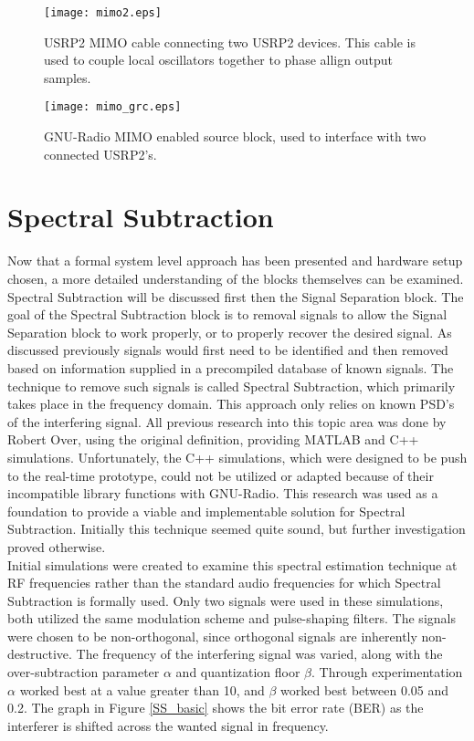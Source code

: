 \begin{figure}[!ht]
\centering
\texttt{[image: mimo2.eps]}%
\caption{USRP2 MIMO cable connecting two USRP2 devices.  This cable is used to couple local oscillators together to phase allign output samples.}
\label{mimo}
\end{figure} 

\begin{figure}[!ht]
\centering
\texttt{[image: mimo\_grc.eps]}
\caption{GNU-Radio MIMO enabled source block, used to interface with two connected USRP2's.}
\label{mimo_grc}
\end{figure} 


\section{Spectral Subtraction}

Now that a formal system level approach has been presented and hardware setup chosen, a more detailed understanding of the blocks themselves can be examined.  Spectral Subtraction will be discussed first then the Signal Separation block.  The goal of the Spectral Subtraction block is to removal signals to allow the Signal Separation block to work properly, or to properly recover the desired signal.  As discussed previously signals would first need to be identified and then removed based on information supplied in a precompiled database of known signals.  The technique to remove such signals is called Spectral Subtraction, which primarily takes place in the frequency domain.  This approach only relies on known PSD's of the interfering signal.  All previous research into this topic area was done by Robert Over, using the original definition, providing MATLAB and C++ simulations.  Unfortunately, the C++ simulations, which were designed to be push to the real-time prototype, could not be utilized or adapted because of their incompatible library functions with GNU-Radio.  This research was used as a foundation to provide a viable and implementable solution for Spectral Subtraction.  Initially this technique seemed quite sound, but further investigation proved otherwise.\\

Initial simulations were created to examine this spectral estimation technique at RF frequencies rather than the standard audio frequencies for which Spectral Subtraction is formally used.  Only two signals were used in these simulations, both utilized the same modulation scheme and pulse-shaping filters.  The signals were chosen to be non-orthogonal, since orthogonal signals are inherently non-destructive.  The frequency of the interfering signal was varied, along with the over-subtraction parameter \(\alpha\) and quantization floor \(\beta\).  Through experimentation \(\alpha\) worked best at a value greater than 10, and \(\beta\) worked best between 0.05 and 0.2.  The graph in Figure \ref{SS_basic} shows the bit error rate (BER) as the interferer is shifted across the wanted signal in frequency.\\


